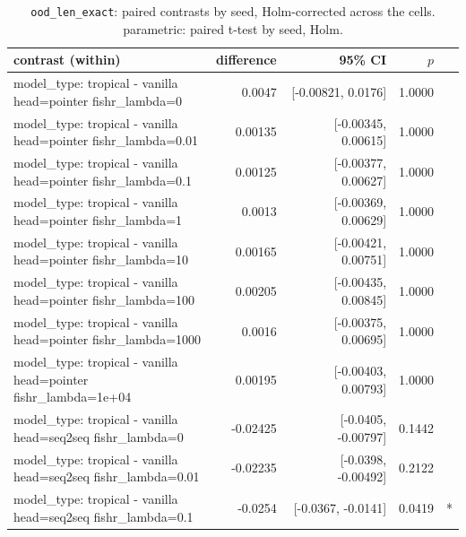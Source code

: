 \documentclass[10pt]{article}
\makeatletter
\newcommand{\stackcell}[1]{\begin{tabular}[t]{@{}l@{}}#1\end{tabular}}
\makeatother
\begin{document}
{\small
\begin{longtable}{lrrrl}
\caption{\texttt{ood\_len\_exact}: paired contrasts by seed, Holm-corrected across the cells. parametric: paired t-test by seed, Holm.}\label{tab:paired-ood_len_exact}\\
\toprule
contrast (within) & difference & 95\% CI & $p$ & \\
\midrule
\endhead
\stackcell{model\_type: tropical - vanilla\\\footnotesize head=pointer fishr\_lambda=0 } & 0.0047 & [-0.00821, 0.0176] & 1.0000 & \\
\stackcell{model\_type: tropical - vanilla\\\footnotesize head=pointer fishr\_lambda=0.01 } & 0.00135 & [-0.00345, 0.00615] & 1.0000 & \\
\stackcell{model\_type: tropical - vanilla\\\footnotesize head=pointer fishr\_lambda=0.1 } & 0.00125 & [-0.00377, 0.00627] & 1.0000 & \\
\stackcell{model\_type: tropical - vanilla\\\footnotesize head=pointer fishr\_lambda=1 } & 0.0013 & [-0.00369, 0.00629] & 1.0000 & \\
\stackcell{model\_type: tropical - vanilla\\\footnotesize head=pointer fishr\_lambda=10 } & 0.00165 & [-0.00421, 0.00751] & 1.0000 & \\
\stackcell{model\_type: tropical - vanilla\\\footnotesize head=pointer fishr\_lambda=100 } & 0.00205 & [-0.00435, 0.00845] & 1.0000 & \\
\stackcell{model\_type: tropical - vanilla\\\footnotesize head=pointer fishr\_lambda=1000 } & 0.0016 & [-0.00375, 0.00695] & 1.0000 & \\
\stackcell{model\_type: tropical - vanilla\\\footnotesize head=pointer fishr\_lambda=1e+04 } & 0.00195 & [-0.00403, 0.00793] & 1.0000 & \\
\stackcell{model\_type: tropical - vanilla\\\footnotesize head=seq2seq fishr\_lambda=0 } & -0.02425 & [-0.0405, -0.00797] & 0.1442 & \\
\stackcell{model\_type: tropical - vanilla\\\footnotesize head=seq2seq fishr\_lambda=0.01 } & -0.02235 & [-0.0398, -0.00492] & 0.2122 & \\
\stackcell{model\_type: tropical - vanilla\\\footnotesize head=seq2seq fishr\_lambda=0.1 } & -0.0254 & [-0.0367, -0.0141] & 0.0419 & *\\

\end{longtable}}
\end{document}
